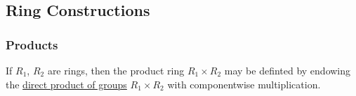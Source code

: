 \subsection{Ring Constructions}\label{ringconstructions}

\subsubsection{Products}\label{ringproducts}
If $R_1$, $R_2$ are rings, then the product ring $R_1 \times R_2$ may be definted by endowing the
\hyperref[groupproduct]{direct product of groups} $R_1 \times R_2$ with componentwise multiplication.